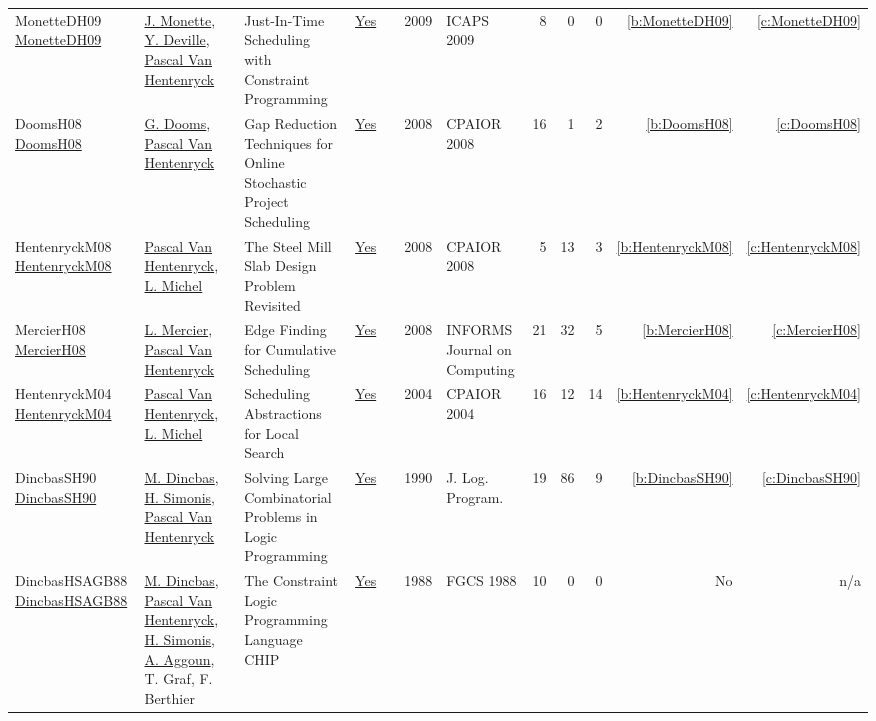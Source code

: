{\begin{longtable}{>{\raggedright\arraybackslash}p{3cm}>{\raggedright\arraybackslash}p{6cm}>{\raggedright\arraybackslash}p{6.5cm}rrrp{2.5cm}rrrrr}
MonetteDH09 \href{http://aaai.org/ocs/index.php/ICAPS/ICAPS09/paper/view/712}{MonetteDH09} & \hyperref[auth:a150]{J. Monette}, \hyperref[auth:a152]{Y. Deville}, \hyperref[auth:a149]{Pascal Van Hentenryck} & Just-In-Time Scheduling with Constraint Programming & \href{works/MonetteDH09.pdf}{Yes} & \cite{MonetteDH09} & 2009 & ICAPS 2009 & 8 & 0 & 0 & \ref{b:MonetteDH09} & \ref{c:MonetteDH09}\\
DoomsH08 \href{https://doi.org/10.1007/978-3-540-68155-7\_8}{DoomsH08} & \hyperref[auth:a365]{G. Dooms}, \hyperref[auth:a149]{Pascal Van Hentenryck} & Gap Reduction Techniques for Online Stochastic Project Scheduling & \href{works/DoomsH08.pdf}{Yes} & \cite{DoomsH08} & 2008 & CPAIOR 2008 & 16 & 1 & 2 & \ref{b:DoomsH08} & \ref{c:DoomsH08}\\
HentenryckM08 \href{https://doi.org/10.1007/978-3-540-68155-7\_41}{HentenryckM08} & \hyperref[auth:a149]{Pascal Van Hentenryck}, \hyperref[auth:a32]{L. Michel} & The Steel Mill Slab Design Problem Revisited & \href{works/HentenryckM08.pdf}{Yes} & \cite{HentenryckM08} & 2008 & CPAIOR 2008 & 5 & 13 & 3 & \ref{b:HentenryckM08} & \ref{c:HentenryckM08}\\
MercierH08 \href{http://dx.doi.org/10.1287/ijoc.1070.0226}{MercierH08} & \hyperref[auth:a864]{L. Mercier}, \hyperref[auth:a149]{Pascal Van Hentenryck} & Edge Finding for Cumulative Scheduling & \href{works/MercierH08.pdf}{Yes} & \cite{MercierH08} & 2008 & INFORMS Journal on Computing & 21 & 32 & 5 & \ref{b:MercierH08} & \ref{c:MercierH08}\\
HentenryckM04 \href{https://doi.org/10.1007/978-3-540-24664-0\_22}{HentenryckM04} & \hyperref[auth:a149]{Pascal Van Hentenryck}, \hyperref[auth:a32]{L. Michel} & Scheduling Abstractions for Local Search & \href{works/HentenryckM04.pdf}{Yes} & \cite{HentenryckM04} & 2004 & CPAIOR 2004 & 16 & 12 & 14 & \ref{b:HentenryckM04} & \ref{c:HentenryckM04}\\
DincbasSH90 \href{https://doi.org/10.1016/0743-1066(90)90052-7}{DincbasSH90} & \hyperref[auth:a726]{M. Dincbas}, \hyperref[auth:a17]{H. Simonis}, \hyperref[auth:a149]{Pascal Van Hentenryck} & Solving Large Combinatorial Problems in Logic Programming & \href{works/DincbasSH90.pdf}{Yes} & \cite{DincbasSH90} & 1990 & J. Log. Program. & 19 & 86 & 9 & \ref{b:DincbasSH90} & \ref{c:DincbasSH90}\\
DincbasHSAGB88 \href{}{DincbasHSAGB88} & \hyperref[auth:a726]{M. Dincbas}, \hyperref[auth:a149]{Pascal Van Hentenryck}, \hyperref[auth:a17]{H. Simonis}, \hyperref[auth:a734]{A. Aggoun}, T. Graf, F. Berthier & The Constraint Logic Programming Language {CHIP} & \href{works/DincbasHSAGB88.pdf}{Yes} & \cite{DincbasHSAGB88} & 1988 & FGCS 1988 & 10 & 0 & 0 & No & n/a\\
\end{longtable}
}

